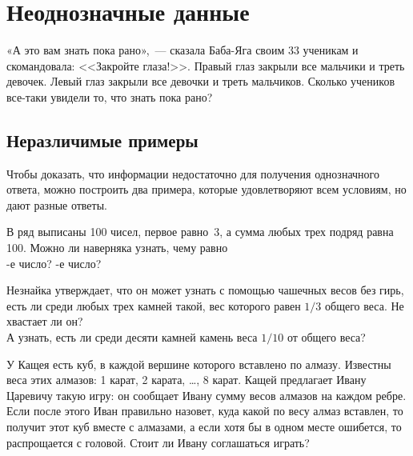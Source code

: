 
\section*{Неоднозначные данные}



\begin{flushright}
«А это вам знать пока рано»,~--- сказала Баба-Яга своим 33 ученикам
и скомандовала:
<<Закройте глаза!>>.
Правый глаз закрыли все мальчики и треть девочек.
Левый глаз закрыли все девочки и треть мальчиков.
Сколько учеников все-таки увидели то, что знать пока рано?
\end{flushright}

\subsection*{Неразличимые примеры}

Чтобы доказать, что информации недостаточно для получения однозначного ответа,
можно построить два примера, которые удовлетворяют всем условиям, но дают
разные ответы.

\begin{problems}

\item
В ряд выписаны 100 чисел, первое равно~3, а сумма любых трех подряд равна 100.
Можно ли наверняка узнать, чему равно
\\
-е число?
\quad
{}-е число?

\item
\sp
Незнайка утверждает, что он может узнать с помощью чашечных весов без гирь,
есть ли среди любых трех камней такой, вес которого равен $1/3$ общего веса.
Не хвастает ли он?
\\
\sp
А узнать, есть ли среди десяти камней камень веса $1/10$ от общего веса?

\item
У Кащея есть куб, в каждой вершине которого вставлено по алмазу.
Известны веса этих алмазов: 1 карат, 2 карата, \ldots, 8 карат.
Кащей предлагает Ивану Царевичу такую игру: он сообщает Ивану сумму весов
алмазов на каждом ребре.
Если после этого Иван правильно назовет, куда какой по весу алмаз вставлен,
то получит этот куб вместе с алмазами, а если хотя бы в одном месте ошибется,
то распрощается с головой.
Стоит ли Ивану соглашаться играть?

\end{problems}

